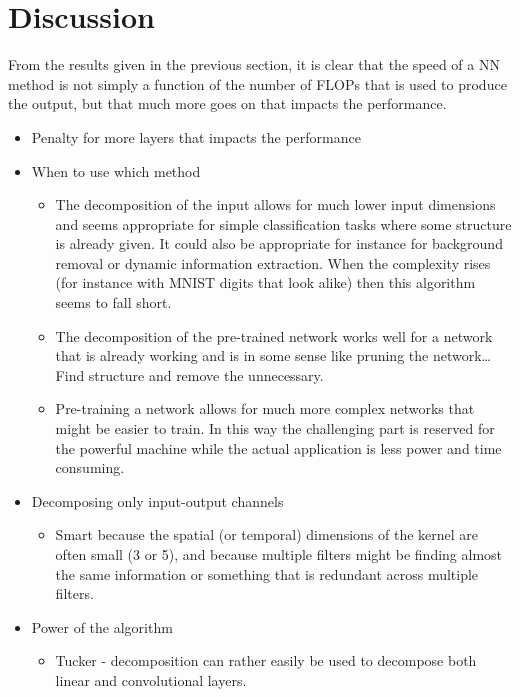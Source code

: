 \section{Discussion} \label{tex:discussion}

From the results given in the previous section, it is clear that the speed of a NN method is not simply a function of the number of FLOPs that is used to produce the output, but that much more goes on that impacts the performance.

\begin{itemize}
    \item Penalty for more layers that impacts the performance
    \item When to use which method
    \begin{itemize}
        \item The decomposition of the input allows for much lower input dimensions and seems appropriate for simple classification tasks where some structure is already given. It could also be appropriate for instance for background removal or dynamic information extraction. When the complexity rises (for instance with MNIST digits that look alike) then this algorithm seems to fall short.
        \item The decomposition of the pre-trained network works well for a network that is already working and is in some sense like pruning the network… Find structure and remove the unnecessary. 
        \item Pre-training a network allows for much more complex networks that might be easier to train. In this way the challenging part is reserved for the powerful machine while the actual application is less power and time consuming.
    \end{itemize}
    \item Decomposing only input-output channels
    \begin{itemize}
        \item  Smart because the spatial (or temporal) dimensions of the kernel are often small (3 or 5), and because multiple filters might be finding almost the same information or something that is redundant across multiple filters.
    \end{itemize}
    \item Power of the algorithm
    \begin{itemize}
        \item Tucker - decomposition can rather easily be used to decompose both linear and convolutional layers. 
    \end{itemize}
\end{itemize}

